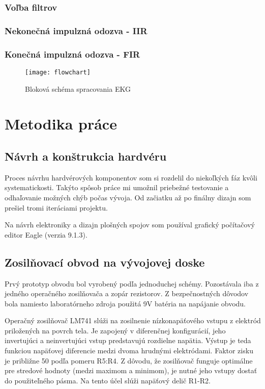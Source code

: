 \documentclass[titlepage]{article}
\begin{document}
\newpage
\subsubsection{Voľba filtrov}
\subsubsection*{Nekonečná impulzná odozva - IIR}
\subsubsection*{Konečná impulzná odozva - FIR}



\begin{figure}[!ht]
\begin{center}
\texttt{[image: flowchart]}
\caption{Bloková schéma spracovania EKG}
\end{center}
\end{figure}

\newpage
\section{Metodika práce}
\subsection*{Návrh a konštrukcia hardvéru}
Proces návrhu hardvérových komponentov som si rozdelil do niekoľkých fáz kvôli systematickosti. Takýto spôsob práce mi umožnil priebežné testovanie a odhaľovanie možných chýb počas vývoja. Od začiatku až po finálny dizajn som prešiel tromi iteráciami projektu. 

Na návrh elektroniky a dizajn plošných spojov som používal grafický počítačový editor Eagle (verzia 9.1.3).

\subsection{Zosilňovací obvod na vývojovej doske}
Prvý prototyp obvodu bol vyrobený podľa jednoduchej schémy. Pozostávala iba z jedného operačného zosilňovača a zopár rezistorov. Z bezpečnostných dôvodov bola namiesto laboratórneho zdroja použitá 9V batéria na napájanie obvodu. 

Operačný zosilňovač LM741 slúži na zosilnenie nízkonapäťového vstupu z elektród priložených na povrch tela. Je zapojený v diferenčnej konfigurácií, jeho invertujúci a neinvertujúci vstup predstavujú rozdielne napätia. Výstup je teda funkciou napäťovej diferencie medzi dvoma hrudnými elektródami. Faktor zisku je približne 50 podľa pomeru R5:R4. Z dôvodu, že zosilňovač funguje optimálne pre stredové hodnoty (medzi maximom a minimom), je nutné jeho vstupy dostať do použiteľného pásma. Na tento účel slúži napäťový delič R1-R2.
\end{document}
